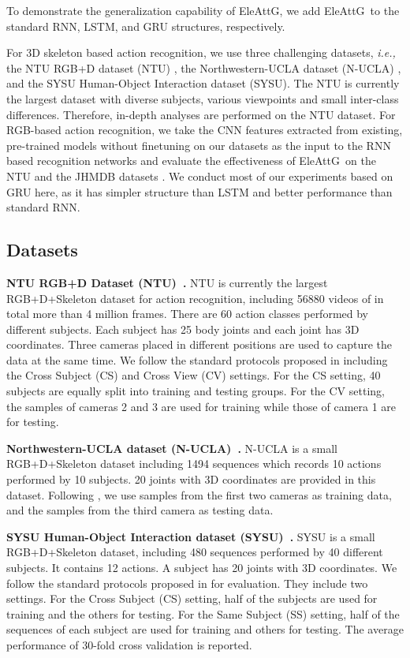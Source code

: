 \documentclass[runningheads]{llncs}
\newcommand{\EleAttGn}{{EleAttG}}
\newcommand{\EleAttG}{{EleAttG~}}
\begin{document}
To demonstrate the generalization capability of \EleAttGn, we add \EleAttG to the standard RNN, LSTM, and GRU structures, respectively. 

For 3D skeleton based action recognition, we use three challenging datasets, {\it{i.e.},} the NTU RGB+D dataset (NTU) \cite{Shahroudy_2016_CVPR}, the Northwestern-UCLA dataset (N-UCLA) \cite{wang2014cross}, and the SYSU Human-Object Interaction dataset (SYSU)\cite{hu2015jointly}. The NTU is currently the largest dataset with diverse subjects, various viewpoints and small inter-class differences. Therefore, in-depth analyses are performed on the NTU dataset. For RGB-based action recognition, we take the CNN features extracted from existing, pre-trained models without finetuning on our datasets as the input to the RNN based recognition networks and evaluate the effectiveness of \EleAttG on the NTU and the JHMDB datasets \cite{jhuang2013towards}. We conduct most of our experiments based on GRU here, as it has simpler structure than LSTM and better performance than standard RNN. 



\subsection{Datasets}
\label{datasets}
\textbf{NTU RGB+D Dataset (NTU)~\cite{Shahroudy_2016_CVPR}.} NTU is currently the largest RGB+D+Skeleton dataset for action recognition, including 56880 videos of in total more than 4 million frames. There are 60 action classes performed by different subjects. Each subject has 25 body joints and each joint has 3D coordinates. Three cameras placed in different positions are used to capture the data at the same time. We follow the standard protocols proposed in \cite{Shahroudy_2016_CVPR} including the Cross Subject (CS) and Cross View (CV) settings. For the CS setting, 40 subjects are equally split into training and testing groups. For the CV setting, the samples of cameras 2 and 3 are used for training while those of camera 1 are for testing. 


\textbf{Northwestern-UCLA dataset (N-UCLA)~\cite{wang2014cross}.} N-UCLA is a small RGB+D+Skeleton dataset including 1494 sequences which records 10 actions performed by 10 subjects. 20 joints with 3D coordinates are provided in this dataset. Following \cite{wang2014cross}, we
use samples from the first two cameras as training data, and the
samples from the third camera as testing data. 


\textbf{SYSU Human-Object Interaction dataset (SYSU)~\cite{hu2015jointly}.} SYSU is a small RGB+D+Skeleton dataset, including 480 sequences performed by 40 different subjects. It contains 12 actions. A subject has 20 joints with 3D coordinates. We follow the standard protocols proposed in \cite{hu2015jointly} for evaluation. They include two settings. For the Cross Subject (CS) setting, half of the subjects are used for training and the others for testing. For the Same Subject (SS) setting, half of the sequences of each subject are used for training and others for testing. The average performance of 30-fold cross validation is reported.
\end{document}
